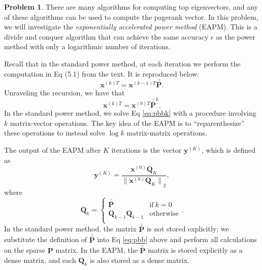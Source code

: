 \documentclass[10pt]{exam}
\theoremstyle{definition}
\newtheorem{problem}{Problem}
\newcommand{\Q}{\mathbf Q}
\newcommand{\p}{\mathbf P}
\newcommand{\pb}{\bar {\p}}
\newcommand{\pbb}{\bar {\pb}}
\newcommand{\x}{\mathbf x}
\newcommand{\y}{\mathbf y}
\newcommand{\ltwo}[1]{{\lVert {#1} \rVert}_2}
\begin{document}
\begin{problem}
    There are many algorithms for computing top eigenvectors,
    and any of these algorithms can be used to compute the pagerank vector.
    In this problem, we will investigate the \emph{exponentially accelerated power method} (EAPM).
    This is a divide and conquer algorithm that can achieve the same accuracy $\epsilon$ as the power method with only a logarithmic number of iterations.

    Recall that in the standard power method, at each iteration we perform the computation in Eq (5.1) from the text.
    It is reproduced below:
    \begin{equation}
        \label{eq:pbb}
        \x^{(k)T} = {\x^{(k-1)T}} \pbb
        .
    \end{equation}
    Unraveling the recursion, we have that
    \begin{equation}
        \label{eq:pbbk}
        \x^{(k)T} = {\x^{(0)T}} \pbb^k
        .
    \end{equation}
    In the standard power method, we solve Eq \eqref{eq:pbbk} with a procedure involving $k$ matrix-vector operations.
    The key idea of the EAPM is to ``reparenthesize'' these operations to instead solve $\log k$ matrix-matrix operations.


    The output of the EAPM after $K$ iterations is the vector $\y^{(K)}$, which is defined as
    \begin{equation}
        \label{eq:exp:y}
        \y^{(K)} = \frac{\x^{(0)} \Q_K}{\ltwo{\x^{(0)} \Q_K}}
        ,
    \end{equation}
    where
    \begin{equation}
        \Q_k = 
        \begin{cases}
            \pbb & \text{if}~k=0 \\
            \Q_{k-1} \Q_{k-1} & \text{otherwise} \\
        \end{cases}
        .
    \end{equation}
    In the standard power method, the matrix $\pbb$ is not stored explicitly;
    we substitute the definition of $\pbb$ into Eq \eqref{eq:pbb} above and perform all calculations on the sparse $\p$ matrix.
    In the EAPM, the $\pbb$ matrix is stored explicitly as a dense matrix,
    and each $\Q_k$ is also stored as a dense matrix.

    \begin{enumerate}
%


\end{enumerate}
\end{problem}
\end{document}
